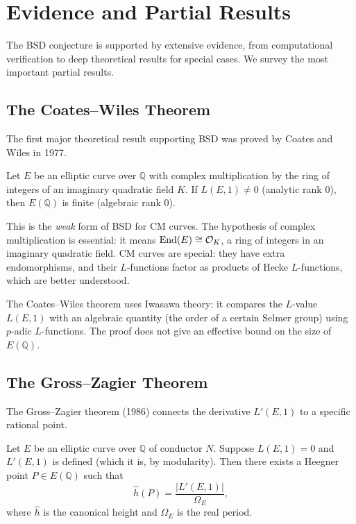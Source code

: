 \section{Evidence and Partial Results}
\label{sec:evidence}

The BSD conjecture is supported by extensive evidence, from computational verification to deep theoretical results for special cases. We survey the most important partial results.

\subsection{The Coates--Wiles Theorem}

The first major theoretical result supporting BSD was proved by Coates and Wiles in 1977.

\begin{theorem}
Let $E$ be an elliptic curve over $\mathbb{Q}$ with complex multiplication by the ring of integers of an imaginary quadratic field $K$. If $L(E, 1) \neq 0$ (analytic rank 0), then $E(\mathbb{Q})$ is finite (algebraic rank 0).
\end{theorem}

This is the \emph{weak} form of BSD for CM curves. The hypothesis of complex multiplication is essential: it means $\operatorname{End}(E) \cong \mathcal{O}_K$, a ring of integers in an imaginary quadratic field. CM curves are special: they have extra endomorphisms, and their $L$-functions factor as products of Hecke $L$-functions, which are better understood.

The Coates--Wiles theorem uses Iwasawa theory: it compares the $L$-value $L(E, 1)$ with an algebraic quantity (the order of a certain Selmer group) using $p$-adic $L$-functions. The proof does not give an effective bound on the size of $E(\mathbb{Q})$.

\subsection{The Gross--Zagier Theorem}

The Gross--Zagier theorem (1986) connects the derivative $L'(E, 1)$ to a specific rational point.

\begin{theorem}
Let $E$ be an elliptic curve over $\mathbb{Q}$ of conductor $N$. Suppose $L(E, 1) = 0$ and $L'(E, 1)$ is defined (which it is, by modularity). Then there exists a Heegner point $P \in E(\mathbb{Q})$ such that
\[
\hat{h}(P) = \frac{|L'(E, 1)|}{\Omega_E},
\]
where $\hat{h}$ is the canonical height and $\Omega_E$ is the real period.
\end{theorem}

